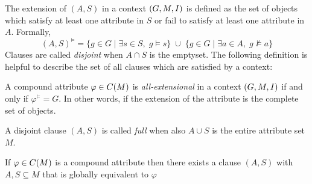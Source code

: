 The extension of $(A,S)$ in a context $(G,M,\mathrel{I})$ is defined as the set of objects which satisfy at least one attribute in $S$
or fail to satisfy at least one attribute in $A$. Formally,
\[
	(A,S)^{\vDash}= \{ g \in G \mid \exists s \in S,\; g\vDash s \} \;\cup\; \{ g \in G \mid \exists a \in A,\; g \nvDash a
	\}
\]
Clauses are called \textit{disjoint} when $A \cap S$ is the emptyset. The following definition is helpful to describe the
set of all clauses which are satisfied by a context:
%
\begin{definition}
	\label{definition:all-extensional}

	A compound attribute $\varphi \in C(M)$ is \emph{all-extensional} in a context $(G,M,\mathrel{I})$ if and only if $\varphi^{\vDash}
	= G$. In other words, if the extension of the attribute is the complete set of objects.
\end{definition}

A disjoint clause $(A,S)$ is called \textit{full} when also $A \cup S$ is the entire attribute set $M$.
\begin{proposition}
	\label{proposition:clause-up-to-equivalence}

	If $\varphi \in C(M)$ is a compound attribute then there exists a clause $(A,S)$ with $A,S \subseteq M$ that is
	globally equivalent to $\varphi$
\end{proposition}

